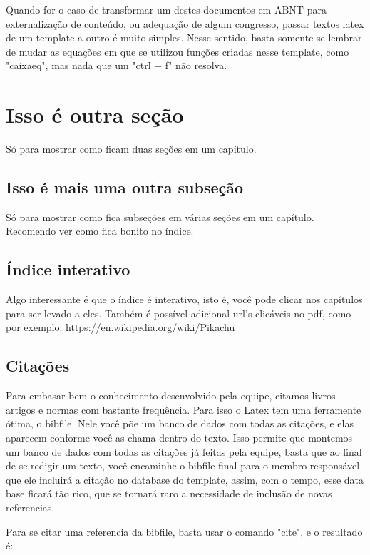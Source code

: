 Quando for o caso de transformar um destes documentos em ABNT para externalização de conteúdo, ou adequação de algum congresso, passar textos latex de um template a outro é muito simples. Nesse sentido, basta somente se lembrar de mudar as equações em que se utilizou funções criadas nesse template, como "caixaeq", mas nada que um "ctrl + f" não resolva.  

\section{Isso é outra seção}

Só para mostrar como ficam duas seções em um capítulo.

\subsection{Isso é mais uma outra subseção}

Só para mostrar como fica subseções em várias seções em um capítulo. Recomendo ver como fica bonito no índice.

\subsection{Índice interativo}

Algo interessante é que o índice é interativo, isto é, você pode clicar nos capítulos para ser levado a eles. Também é possível adicional url's clicáveis no pdf, como por exemplo: \url{https://en.wikipedia.org/wiki/Pikachu}

\subsection{Citações}

Para embasar bem o conhecimento desenvolvido pela equipe, citamos livros artigos e normas com bastante frequência. Para isso o Latex tem uma ferramente ótima, o bibfile. Nele você põe um banco de dados com todas as citações, e elas aparecem conforme você as chama dentro do texto. Isso permite que montemos um banco de dados com todas as citações já feitas pela equipe, basta que ao final de se redigir um texto, você encaminhe o bibfile final para o membro responsável que ele incluirá a citação no database do template, assim, com o tempo, esse data base ficará tão rico, que se tornará raro a necessidade de inclusão de novas referencias.

Para se citar uma referencia da bibfile, basta usar o comando "cite", e o resultado é: \cite{CavaliniJunior2015}


